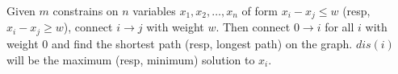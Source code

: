 Given $m$ constrains on $n$ variables $x_1, x_2, \ldots, x_n$ of form $x_i - x_j \leq w$ (resp, $x_i - x_j \geq w$), connect $i \rightarrow j$ with weight $w$. Then connect $0 \rightarrow i$ for all $i$ with weight $0$ and find the shortest path (resp, longest path) on the graph. $dis(i)$ will be the maximum (resp, minimum) solution to $x_i$.
